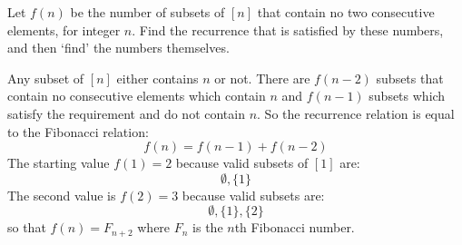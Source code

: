 \begin{exercise}
    \label{ex:1-11}
    Let $f(n)$ be the number of subsets of $[n]$ that contain no two consecutive elements, for integer $n$. Find the recurrence that is satisfied by these numbers, and then `find' the numbers themselves.
\end{exercise}
\begin{solution}
    Any subset of $[n]$ either contains $n$ or not. There are $f(n-2)$ subsets that contain no consecutive elements which contain $n$ and $f(n-1)$ subsets which satisfy the requirement and do not contain $n$. So the recurrence relation is equal to the Fibonacci relation:
    \[
        f(n) = f(n-1) + f(n-2)
    \]
    The starting value $f(1) = 2$ because valid subsets of $[1]$ are:
    \[
        \emptyset, \{1\}
    \]
    The second value is $f(2) = 3$ because valid subsets are:
    \[
        \emptyset, \{1\}, \{2\}
    \]
    so that $f(n) = F_{n+2}$ where $F_n$ is the $n$th Fibonacci number.
\end{solution}

